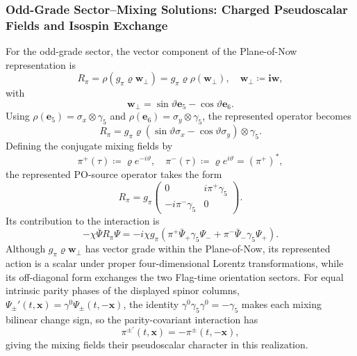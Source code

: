 \subsubsection{Odd-Grade Sector--Mixing Solutions: Charged Pseudoscalar Fields and Isospin Exchange}
For the odd-grade sector, the vector component of the Plane-of-Now representation is
\begin{equation}\label{eq_plane_now_vector_operator}
    R_{\pi} = \rho(g_{\pi}\varrho\mathbf{w}_{\perp}) = g_{\pi}\varrho\rho(\mathbf{w}_{\perp}), \quad \mathbf{w}_{\perp} \coloneqq \mathbf{i}\mathbf{w},
\end{equation}
with
\begin{equation}
    \mathbf{w}_{\perp} = \sin\vartheta\mathbf{e}_{5} - \cos\vartheta\mathbf{e}_{6}.
\end{equation}
Using $\rho(\mathbf{e}_{5}) = \sigma_{x} \otimes \gamma_{5}$ and $\rho(\mathbf{e}_{6}) = \sigma_{y} \otimes \gamma_{5}$, the represented operator becomes
\begin{equation}\label{eq_plane_now_vector_explicit}
    R_{\pi} = g_{\pi}\varrho\left(\sin\vartheta\sigma_{x} - \cos\vartheta\sigma_{y}\right) \otimes \gamma_{5}.
\end{equation}
Defining the conjugate mixing fields by
\begin{equation}\label{eq_complex_pion_fields}
    \pi^{+}(\tau) \coloneqq \varrho e^{-i\vartheta}, \quad \pi^{-}(\tau) \coloneqq \varrho e^{i\vartheta} = \left(\pi^{+}\right)^{*},
\end{equation}
the represented PO-source operator takes the form
\begin{equation}\label{eq_plane_now_vector_complex}
    R_{\pi} = g_{\pi}\begin{pmatrix}0 & i\pi^{+}\gamma_{5} \\ -i\pi^{-}\gamma_{5} & 0\end{pmatrix}.
\end{equation}
Its contribution to the interaction is
\begin{equation}\label{eq_pion_interaction}
    -\chi\bar{\Psi}R_{\pi}\Psi = -i\chi g_{\pi}\left(\pi^{+}\bar{\Psi}_{+}\gamma_{5}\Psi_{-} + \pi^{-}\bar{\Psi}_{-}\gamma_{5}\Psi_{+}\right).
\end{equation}
Although $g_{\pi}\varrho\mathbf{w}_{\perp}$ has vector grade within the Plane-of-Now, its represented action is a scalar under proper four-dimensional Lorentz transformations, while its off-diagonal form exchanges the two Flag-time orientation sectors. For equal intrinsic parity phases of the displayed spinor columns, $\Psi_{\pm}'(t,\mathbf{x})=\gamma^{0}\Psi_{\pm}(t,-\mathbf{x})$, the identity $\gamma^{0}\gamma_{5}\gamma^{0}=-\gamma_{5}$ makes each mixing bilinear change sign, so the parity-covariant interaction has
\begin{equation}
    \pi^{\pm\prime}(t,\mathbf{x})=-\pi^{\pm}(t,-\mathbf{x}),
\end{equation}
giving the mixing fields their pseudoscalar character in this realization.

